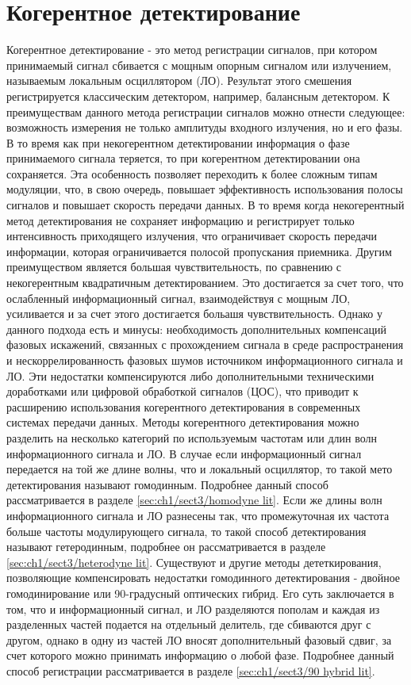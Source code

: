 \section{Когерентное детектирование}\label{sec:ch1/sect3}
Когерентное детектирование - это метод регистрации сигналов, при котором принимаемый сигнал сбивается с мощным опорным сигналом или излучением, называемым локальным осциллятором (ЛО). Результат этого смешения регистрируется классическим детектором, например, балансным детектором. К преимуществам данного метода регистрации сигналов  можно отнести следующее: возможность измерения не только амплитуды входного излучения, но и его фазы. В то время как при некогерентном детектировании информация о фазе принимаемого сигнала теряется, то при когерентном детектировании она сохраняется. Эта особенность позволяет переходить к более сложным типам модуляции, что, в свою очередь, повышает эффективность использования полосы сигналов и повышает скорость передачи данных. В то время когда некогерентный метод детектирования не сохраняет информацию и регистрирует только интенсивность приходящего излучения, что ограничивает скорость передачи информации, которая ограничивается полосой пропускания приемника. Другим преимуществом является большая чувствительность, по сравнению с некогерентным квадратичным детектированием. Это достигается за счет того, что ослабленный информационный сигнал, взаимодействуя с мощным ЛО, усиливается и за счет этого достигается больашя чувствительность. 
Однако у данного подхода есть и минусы: необходимость дополнительных компенсаций фазовых искажений, связанных с прохождением сигнала в среде распространения и нескоррелированность фазовых шумов источником информационного сигнала и ЛО.  Эти недостатки компенсируются либо дополнительными техническими доработками или цифровой обработкой сигналов (ЦОС), что приводит к расширению использования когерентного детектирования в современных системах передачи данных.
\newline Методы когерентного детектирования можно разделить на несколько категорий по используемым частотам или длин волн информационного сигнала и ЛО. В случае если информационный сигнал передается на той же длине волны, что и локальный осциллятор, то такой мето детектирования называют гомодинным. Подробнее данный способ рассматривается в разделе \ref{sec:ch1/sect3/homodyne lit}.
Если же длины волн информационного сигнала и ЛО разнесены так, что промежуточная их частота больше частоты модулирующего сигнала, то такой способ детектирования называют гетеродинным, подробнее он рассматривается в разделе \ref{sec:ch1/sect3/heterodyne lit}. Существуют и другие методы дететкирования, позволяющие компенсировать недостатки гомодинного детектирования - двойное гомодинирование или 90-градусный оптических гибрид. Его суть заключается в том, что и информационный сигнал, и ЛО разделяются пополам и каждая из разделенных частей подается на отдельный делитель, где сбиваются друг с другом, однако в одну из частей ЛО вносят дополнительный фазовый сдвиг, за счет которого можно принимать информацию о любой фазе. Подробнее данный способ регистрации рассматривается в разделе \ref{sec:ch1/sect3/90 hybrid lit}.

